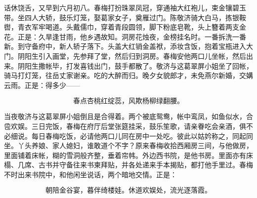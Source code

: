 话休饶舌，又早到六月初八。春梅打扮珠翠凤冠，穿通袖大红袍儿，束金镶碧玉带。坐四人大轿，鼓乐灯笼，娶葛家女子，奠雁过门。陈敬济骑大白马，拣银鞍辔，青衣军牢喝道。头戴儒巾，穿着青段圆领，脚下粉底皂靴，头上簪着两支金花。正是：久旱逢甘雨，他乡遇故知。洞房花烛夜，金榜挂名时。一番拆洗一番新。到守备府中，新人轿子落下。头盖大红销金盖袱，添妆含饭，抱着宝瓶进入大门。阴阳生引入画堂，先参拜了堂，然后归到洞房。春梅安他两口儿坐帐，然后出来。阴阳生撒帐毕，打发喜钱出门，鼓手都散了。敬济与这葛翠屏小姐坐了回帐，骑马打灯笼，往岳丈家谢亲。吃的大醉而归。晚夕女貌郎才，未免燕尔新婚，交媾云雨。正是：得多少——

\[
春点杏桃红绽蕊，风欺杨柳绿翻腰。
\]

当夜敬济与这葛翠屏小姐倒且是合得着。两个被底鸳鸯，帐中鸾凤，如鱼似水，合卺欢娱。三日完饭，春梅在府厅后堂张筵挂采，鼓乐笙歌，请亲眷吃会亲酒，俱不必细说。每日春梅吃饭，必请他两口儿同在房中一处吃。彼此以姑妗称之，同起同坐。丫头养娘、家人媳妇，谁敢道个不字？原来春梅收拾西厢房三间，与他做房，里面铺着床帐，糊的雪洞般齐整，垂着帘帏。外边西书院，是他书房。里面亦有床榻、几席、古书并守备往来书柬拜贴，并各处递来手本揭贴，都打他手里过。春梅不时出来书院中，和他闲坐说话，两个暗地交情。正是：

\[
朝陪金谷宴，暮伴绮楼娃。
休道欢娱处，流光逐落霞。
\]
